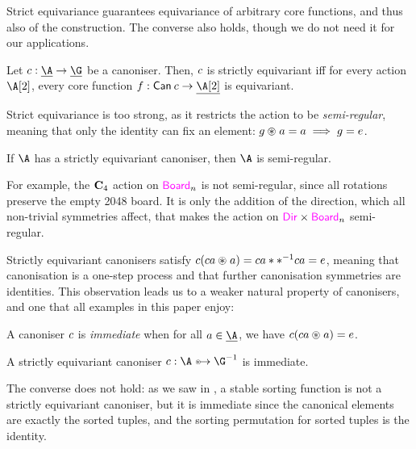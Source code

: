 Strict equivariance guarantees equivariance of arbitrary core functions,
and thus also of the \WLOG{} construction. The converse also holds,
though we do not need it for our applications.

\begin{theorem}
  Let $c : \carrier\A \to \carrier\G$ be a canoniser. Then,
  $c$ is strictly equivariant iff for every action $\B$,
  every core function $f : \Canon\canoniser \to \carrier\B$ is
  equivariant.
\end{theorem}

Strict equivariance is too strong, as it restricts the action to
be \emph{semi-regular}, meaning that only the identity can fix an
element: $g \act a = a \implies g = \unit$.

\begin{lemma}
  If $\A$ has a strictly equivariant canoniser, then $\A$ is
  semi-regular.
\end{lemma}

For example, the $\mathbf{C}_{4}$ action on $\Board n$ is not semi-regular,
since all rotations preserve the empty 2048 board. It is only the
addition of the direction, which all non-trivial symmetries affect,
that makes the action on $\Direction \times \Board n$ semi-regular.

Strictly equivariant canonisers satisfy $\canoniser(\canoniser a
\act a) = \canoniser a \mul \inv*{\canoniser a} = \unit$, meaning that
canonisation is a one-step process and that further canonisation
symmetries are identities. This observation leads us to a weaker natural property
of canonisers, and one that all examples in this paper enjoy:

\begin{definition}
  A canoniser $c$ is \emph{immediate} when for all $a \in
  \carrier\A$, we have $\canoniser(\canoniser a \act a) = \unit$.
\end{definition}

\begin{proposition}
  A strictly equivariant canoniser $\canoniser : \A \equito \inv\G$ is immediate.
\end{proposition}

The converse does not hold: as we saw in , a stable sorting function is not a strictly
equivariant canoniser, but it is immediate since the canonical
elements are exactly the sorted tuples, and the sorting permutation
for sorted tuples is the identity.

